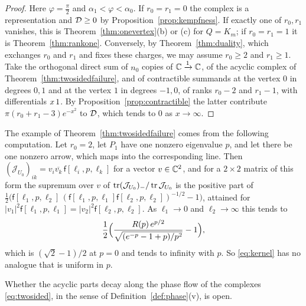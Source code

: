\begin{proof}
Here $\varphi=\frac\pi2$ and $\alpha_1<\varphi<\alpha_0$. If $r_0=r_1=0$ the
complex is a representation and $\mathcal D\geq0$ by
Proposition~\ref{prop:kempfness}. If
exactly one of $r_0,r_1$ vanishes, this is Theorem~\ref{thm:onevertex}(b) or
(c) for $Q=K_m$; if $r_0=r_1=1$ it is Theorem~\ref{thm:rankone}. Conversely, by Theorem~\ref{thm:duality}, which
exchanges $r_0$ and $r_1$ and fixes these charges, we may assume $r_0\geq2$
and $r_1\geq1$. Take the orthogonal direct sum of $n_0$ copies of
$\mathbb C\xrightarrow1\mathbb C$, of the acyclic complex of
Theorem~\ref{thm:twosidedfailure}, and of contractible summands at the vertex
$0$ in degrees $0,1$ and at the vertex $1$ in degrees $-1,0$, of ranks
$r_0-2$ and $r_1-1$, with differentials $x\,1$. By
Proposition~\ref{prop:contractible} the latter contribute
$\pi(r_0+r_1-3)e^{-x^2}$ to $\mathcal D$, which tends to $0$ as $x\to\infty$.
\end{proof}

\begin{remark}\label{rem:interpolation}
The example of Theorem~\ref{thm:twosidedfailure} comes from the following
computation. Let $r_0=2$, let $P_1$ have one nonzero eigenvalue $p$, and let
there be one nonzero arrow, which maps into the corresponding line. Then
$(\mathcal J_{U_0})_{ik}=v_i\overline{v_k}\,\mathsf f[\ell_i,p,\ell_k]$ for a
vector $v\in\mathbb C^2$, and for a $2\times2$ matrix of this form the supremum over
$v$ of $\operatorname{tr}(\mathcal J_{U_0})_-/\operatorname{tr}\mathcal J_{U_0}$ is the positive part of
$\frac12\bigl(\mathsf f[\ell_1,p,\ell_2]\,(\mathsf f[\ell_1,p,\ell_1]\mathsf f[\ell_2,p,\ell_2])^{-1/2}-1\bigr)$,
attained for $|v_1|^2\mathsf f[\ell_1,p,\ell_1]=|v_2|^2\mathsf f[\ell_2,p,\ell_2]$.
As $\ell_1\to0$ and $\ell_2\to\infty$ this tends to
\[
 \frac12\Bigl(\frac{R(p)\,e^{p/2}}{\sqrt{(e^{-p}-1+p)/p^2}}-1\Bigr),
\]
which is $(\sqrt2-1)/2$ at $p=0$ and tends to infinity with $p$. So
\eqref{eq:kernel} has no analogue that is uniform in $p$.

\end{remark}

Whether the acyclic parts decay along the phase flow of the complexes
\eqref{eq:twosided}, in the sense of Definition~\ref{def:phase}(v), is open.
